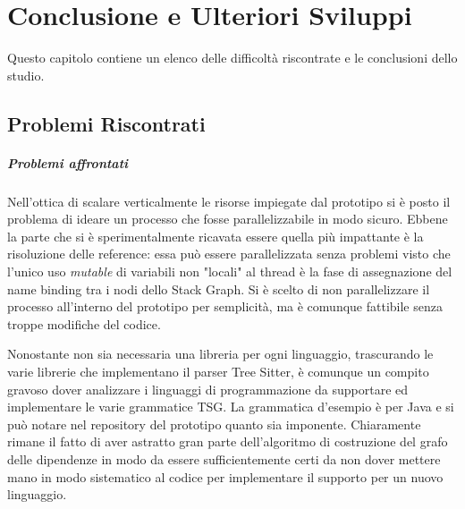 \chapter{Conclusione e Ulteriori Sviluppi}

Questo capitolo contiene un elenco delle difficolt\`a riscontrate e le conclusioni dello studio.

\section{Problemi Riscontrati}

\paragraph{Problemi affrontati}

Nell'ottica di scalare verticalmente le risorse impiegate dal prototipo si \`e posto il problema di ideare un processo che fosse parallelizzabile in modo sicuro. Ebbene la parte che si \`e sperimentalmente ricavata essere quella pi\`u impattante \`e la risoluzione delle reference: essa pu\`o essere parallelizzata senza problemi visto che l'unico uso \emph{mutable} di variabili non "locali" al thread \`e la fase di assegnazione del name binding tra i nodi dello Stack Graph. Si \`e scelto di non parallelizzare il processo all'interno del prototipo per semplicit\`a, ma \`e comunque fattibile senza troppe modifiche del codice.


Nonostante non sia necessaria una libreria per ogni linguaggio, trascurando le varie librerie che implementano il parser Tree Sitter, \`e comunque un compito gravoso dover analizzare i linguaggi di programmazione da supportare ed implementare le varie grammatice TSG. La grammatica d'esempio \`e per Java e si pu\`o notare nel repository del prototipo quanto sia imponente. Chiaramente rimane il fatto di aver astratto gran parte dell'algoritmo di costruzione del grafo delle dipendenze in modo da essere sufficientemente certi da non dover mettere mano in modo sistematico al codice per implementare il supporto per un nuovo linguaggio.

